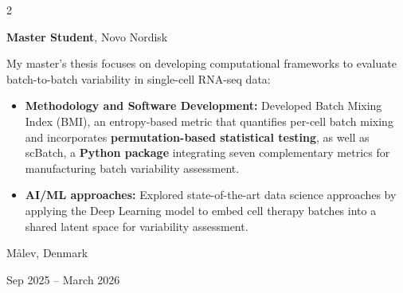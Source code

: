 \documentclass[10pt, letterpaper]{article}
\newenvironment{highlights}{
    \begin{itemize}[
        topsep=0.10 cm,
        parsep=0.10 cm,
        partopsep=0pt,
        itemsep=0pt,
        leftmargin=0.4 cm + 10pt
    ]
}{
    \end{itemize}
}
\newenvironment{twocolentry}[2][]{
    \onecolentry
    \def\secondColumn{#2}
    \setcolumnwidth{\fill, 4.5 cm}
    \begin{paracol}{2}
}{
    \switchcolumn \raggedleft \secondColumn
    \end{paracol}
    \endonecolentry
}
\begin{document}
        \begin{twocolentry}{
    Målev, Denmark

    Sep 2025 -- March 2026
}
    \textbf{Master Student}, Novo Nordisk

    \vspace{0.1cm}

    My master's thesis focuses on developing computational frameworks to evaluate batch-to-batch variability in single-cell RNA-seq data:

    \begin{highlights}

        \item \textbf{Methodology and Software Development:} Developed Batch Mixing Index (BMI), an entropy-based metric that quantifies per-cell batch mixing and incorporates \textbf{permutation-based statistical testing}, as well as scBatch, a \textbf{Python package} integrating seven complementary metrics for manufacturing batch variability assessment.

        \vspace{0.1cm}

        \item \textbf{AI/ML approaches:} Explored state-of-the-art data science approaches by applying the Deep Learning model to embed cell therapy batches into a shared latent space for variability assessment.

    \end{highlights}
\end{twocolentry}

        \vspace{0.3 cm}
\end{document}
